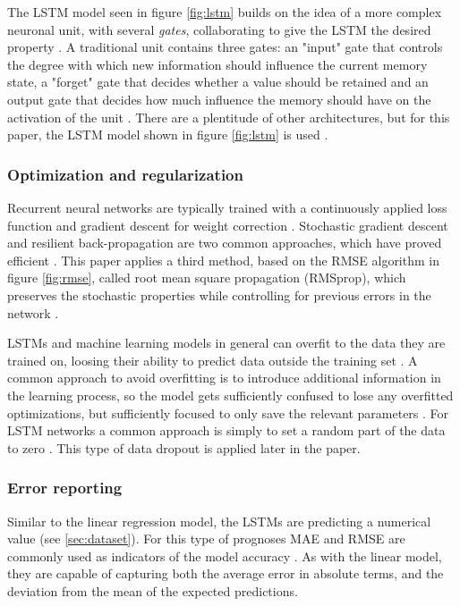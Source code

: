 \documentclass[a4paper]{article}
\begin{document}
The LSTM model seen in figure \ref{fig:lstm} builds on the idea of a more
complex neuronal unit, with several \textit{gates}, collaborating to give
the LSTM the desired property \citep{Gers2001}. A traditional unit contains
three gates: an "input" gate that controls the degree with which new information
should influence the current memory state, a "forget" gate that decides whether
a value should be retained and an output gate that decides how much influence
the memory should have on the activation of the unit \citep{Hochreiter1997, Gers2001}.
There are a plentitude of other architectures, but for this paper, the LSTM
model shown in figure \ref{fig:lstm} is used \citep{Gers2001}.

\subsubsection{Optimization and regularization}
Recurrent neural networks are typically trained with a continuously applied
loss function and gradient descent for weight correction \citep{Russell2009,
Hochreiter1997, Schmidhuber2015}. Stochastic gradient descent and resilient
back-propagation are two common approaches, which have proved efficient
\citep{Russell2009, NILSSON2009}. This paper applies a third method, based on
the RMSE algorithm in figure \ref{fig:rmse}, called root mean square propagation
(RMSprop), which preserves the stochastic properties while controlling
for previous errors in the network \citep{Tieleman2012}.

LSTMs and machine learning models in general can overfit to the data
they are trained on, loosing their ability to predict data outside the training
set \citep{Russell2009, NILSSON2009}.
A common approach to avoid overfitting is to introduce additional
information in the learning process, so the model gets sufficiently confused
to lose any overfitted optimizations, but sufficiently focused to only save
the relevant parameters \citep{Schmidhuber2015, NILSSON2009}. For LSTM networks
a common approach is simply to set a random part of the data to zero
\citep{Schmidhuber2015}. This type of data dropout is applied later in the
paper.

\subsubsection{Error reporting}
Similar to the linear regression model, the LSTMs are predicting a numerical
value (see \ref{sec:dataset}). For this type of prognoses MAE and RMSE are
commonly used as indicators of the model accuracy
\citep{Russell2009, NILSSON2009, Schmidhuber2015}. As with the linear model,
they are capable of capturing both the average error in absolute terms,
and the deviation from the mean of the expected predictions.
\end{document}
